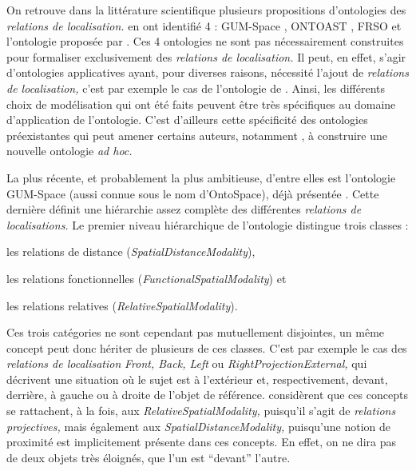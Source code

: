 On retrouve dans la littérature scientifique plusieurs propositions
d'ontologies des \emph{relations de localisation.}
\textcite{Duchene2019} en ont identifié 4 : GUM-Space
\autocite{Bateman2010}, ONTOAST \autocite{Miron2007}, FRSO
\autocite{Hudelot2008a} et l'ontologie proposée par
\textcite{Dasiopoulou2005}. Ces 4 ontologies ne sont pas
nécessairement construites pour formaliser exclusivement des
\emph{relations de localisation.} Il peut, en effet, s'agir
d'ontologies applicatives ayant, pour diverses raisons, nécessité
l'ajout de \emph{relations de localisation,} c'est par exemple le cas
de l'ontologie de \textcite{Dasiopoulou2005}. Ainsi, les différents
choix de modélisation qui ont été faits peuvent être très spécifiques
au domaine d’application de l'ontologie. C'est d'ailleurs cette
spécificité des ontologies préexistantes qui peut amener certains
auteurs, notamment \textcite{Hudelot2008a}, à construire une nouvelle
ontologie \emph{ad hoc.}

La plus récente, et probablement la plus ambitieuse, d'entre elles est
l'ontologie GUM-Space (aussi connue sous le nom d'OntoSpace), déjà
présentée \autocite{Bateman2010}.  Cette dernière définit une
hiérarchie assez complète des différentes \emph{relations de
  localisations.} Le premier niveau hiérarchique de l'ontologie
distingue trois classes :
% 
\begin{enumerate*}
\item les relations de distance (\emph{SpatialDistanceModality}),
\item les relations fonctionnelles
  (\emph{FunctionalSpatialModality}) et
\item les relations relatives (\emph{RelativeSpatialModality}).
\end{enumerate*}
% 
Ces trois catégories ne sont cependant pas mutuellement disjointes, un
même concept peut donc hériter de plusieurs de ces classes. C'est par
exemple le cas des \emph{relations de localisation} \emph{Front, Back,
  Left} ou \emph{RightProjectionExternal,} qui décrivent une situation
où le sujet est à l'extérieur et, respectivement, devant, derrière, à
gauche ou à droite de l'objet de référence. \textcite{Bateman2010}
considèrent que ces concepts se rattachent, à la fois, aux
\emph{RelativeSpatialModality,} puisqu'il s'agit de \emph{relations
  projectives,} mais également aux \emph{SpatialDistanceModality,}
puisqu'une notion de proximité est implicitement présente dans ces
concepts. En effet, on ne dira pas de deux objets très éloignés, que
l'un est \enquote{devant} l'autre.

